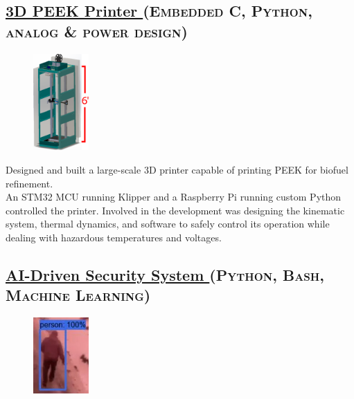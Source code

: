 \documentclass[
	10pt, %
]{FreemanCV}
\begin{document}
\begin{paracol}{2} %

\vspace*{-10pt}
\leavevmode \subsection{\href{https://github.com/jfcbooth/3dpp}{3D PEEK Printer \linkcolor\scriptsize\faLink}
\hfill
\textsc{\footnotesize{(Embedded C, Python, analog \& power design)}}}

\setlength\intextsep{-5pt} %
\begin{figure} %
	\hspace*{-5pt} %
    \includegraphics[width=60pt]{printer} %
\end{figure}

Designed and built a large-scale 3D printer capable of printing PEEK for biofuel refinement.\\

An STM32 MCU running Klipper and a Raspberry Pi running custom Python controlled the printer.
Involved in the development was designing the kinematic system, thermal dynamics, and software to safely control its operation
while dealing with hazardous temperatures and voltages.


\vspace*{0pt}
\leavevmode \subsection{\href{https://github.com/jfcbooth/security_system}{AI-Driven Security System \linkcolor\scriptsize\faLink}
\hfill
\textsc{\footnotesize{(Python, Bash, Machine Learning)}}}

\setlength\intextsep{0pt} %
\begin{figure} %
	\hspace*{-5pt} %
    \includegraphics[width=60pt]{security_system} %
\end{figure}


\end{paracol}
\end{document}

